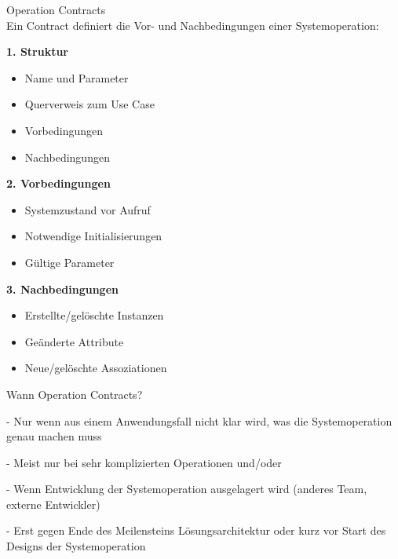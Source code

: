 \begin{KR}{Operation Contracts}\\
Ein Contract definiert die Vor- und Nachbedingungen einer Systemoperation:

\textbf{1. Struktur}
\begin{itemize}
    \item Name und Parameter
    \item Querverweis zum Use Case
    \item Vorbedingungen
    \item Nachbedingungen
\end{itemize}

\textbf{2. Vorbedingungen}
\begin{itemize}
    \item Systemzustand vor Aufruf
    \item Notwendige Initialisierungen
    \item Gültige Parameter
\end{itemize}

\textbf{3. Nachbedingungen}
\begin{itemize}
    \item Erstellte/gelöschte Instanzen
    \item Geänderte Attribute
    \item Neue/gelöschte Assoziationen
\end{itemize}
\end{KR}

\begin{remark}
    Wann Operation Contracts?

    - Nur wenn aus einem Anwendungsfall nicht klar wird, was die Systemoperation genau machen muss
    
    - Meist nur bei sehr komplizierten Operationen und/oder
    
    - Wenn Entwicklung der Systemoperation ausgelagert wird (anderes Team, externe Entwickler)
    
    - Erst gegen Ende des Meilensteins Lösungsarchitektur oder kurz vor Start des Designs der Systemoperation
\end{remark}

